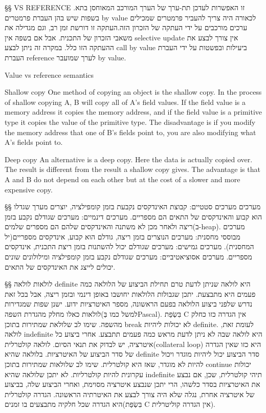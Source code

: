 \begin{טבלא}[!htbp]
        §§ VS REFERENCE
        זו האפשרות לעדכן תת-ערך של הערך המורכב המאוחסן בתא.
        בשפות שיש בהן העברת פרמטרים by value לכאורה היה צריך להעביר פרמטרים שמכילים ערכים מורכבים על ידי העתקה של הזכרון הזה.העתקה זו דורשת זמן רב, וגם מגדילה את משאבי הזכרון של התכנית.
        אבל אם בשפה אין selective update אין צורך לבצע את ההעתקה הזו כלל. במקרה זה ניתן לבצע call by value ביעילות ובפשטות על ידי העברת העברת reference לערך שמועבר by value.

        Value vs reference semantics

        Shallow copy
        One method of copying an object is the shallow copy. In the process of shallow copying A, B will copy all of A's field values. If the field value is a memory address it copies the memory address, and if the field value is a primitive type it copies the value of the primitive type.
        The disadvantage is if you modify the memory address that one of B's fields point to, you are also modifying what A's fields point to.

        Deep copy
        An alternative is a deep copy. Here the data is actually copied over. The result is different from the result a shallow copy gives. The advantage is that A and B do not depend on each other but at the cost of a slower and more expensive copy.

        §§ מערכים
        מערכים סטטיים:
        קבוצת האינדקסים נקבעת בזמן קומפילציה, יוצרים מערך שגדלו הוא קבוע והאינדקסים של התאים הם מספריים.
        מערכים דינמיים:
        מערכים שגודלם נקבע בזמן ריצה ולאחר מכן לא משתנה והאינדקסים שלהם הם מספרים שלמים(ב-heap).
        מערכים מבוססי מחסנית:
        מערכים הנוצרים בזמן ריצה, גודלם הוא קבוע, אינדקסים מספריים(יל המחסנית).
        מערכים גמישים:
        מערכים שגודלם יכול להשתנות בזמן ריצת התכנית, אינדקסים מספריים.
        מערכים אסוציאטיביים:
        מערכים שגודלם נקבע בזמן קומפילציה ומילולונים שונים יכולים לייצג את האינדקסים של התאים.

        §§ לולאות
        לולאה definite היא לולאה שניתן לדעת טרם תחילת הביצוע של הלולאה כמה פעמים היא מתבצעת. יתכן שגבולות הלולאות יחושבו באופן דינמי ובזמן ריצה, אבל בכל זאת נדרש שלפני ביצוע הלולאה בפעם הראשונה, מספר האיטרציות ידוע. ישנן שפות שמגדירות לולאות כאלו מחלק מהגדרת השפה(למשל כמו בְּPascal).
        בִּשְׂפַת C אין הגדרה כזו כחלק מהשפה. שימו לב שלולאת שמתירות בתוכן break לא יכולות ליהיות definite.
        לעומת זאת, לולאה indefinite היא לולאה שבה לא ניתן לדעת מראש כמה פעמים תתבצע. אחרי ביצוע כל איטרציה, יש לבדוק את תנאי הסיום.
        לולאה קולטרלית(collateral loop) היא כזו שאין הגדרה של סדר הביצוע של האיטרציות. בלולאה שהיא definite סדר הביצוע יכול ליהיות מוגדר ויכול להיות לא מוגדר, שאז היא קולטרלית. שימו לב שלולאות שמתירות בתוכן continue יכולות עקרונית להיות קולטרליות. לא יתכן שלולאה שהיא indefinite תיהי קולטרלית, שכן, אם נבצע את האיטרציות בסדר כלשהו, הרי יתכן שנבצע איטרציה מסוימת, ואחרי הביצוע שלה, בביצוע של איטרציה אחרת, נגלה שלא היה צורך לבצע את האיטרתיה הראשונה.
        הגדרה קולטרלית היא הגדרה שכל חלקיה מתבצעים בו זמנים(בִּשְׂפַת C אין הגדרה קוליטרלית).


\end{טבלא}
